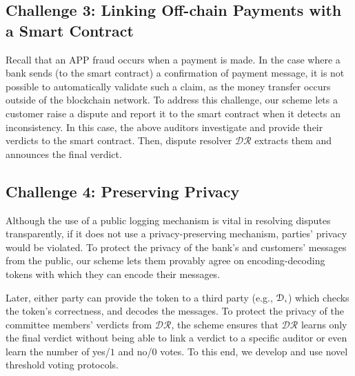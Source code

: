 \subsection{Challenge 3: Linking Off-chain Payments with a Smart Contract}\label{sec::Linking Off-chain-Payments-with-contract}

\vspace{-1mm}


 Recall that an APP fraud occurs when a payment is made. In the case where a  bank sends  (to the smart contract) a confirmation of payment message, it is not possible to automatically validate such a claim, as the money transfer occurs outside of the blockchain network. To address this challenge, our scheme lets a customer raise a dispute and report it to the smart contract when it detects an inconsistency. In this case, the above auditors investigate and provide their verdicts to the smart contract. Then, dispute resolver $\mathcal{DR}$ extracts them and announces the final verdict. 


\vspace{-2.8mm}
\subsection{Challenge 4: Preserving Privacy}
\vspace{-1mm}

 Although the use of a public logging mechanism is vital in resolving disputes transparently, if it does not use a  privacy-preserving mechanism, parties' privacy would be violated. To protect the privacy of the bank's and customers' messages from the public, our scheme lets them provably agree on encoding-decoding tokens with which they can encode their messages. 
 
 Later, either party can provide the token to a third party  (e.g., $\mathcal{D}_{\scriptscriptstyle i}$) which checks the token's correctness, and decodes the messages. To protect the privacy of the committee members' verdicts from $\mathcal{DR}$, the scheme ensures that  $\mathcal{DR}$  learns only the final verdict without being able to link a verdict to a specific auditor or even learn the number of yes/$1$ and no/$0$ votes. To this end, we develop and use novel threshold voting protocols. 
 
 
 
 